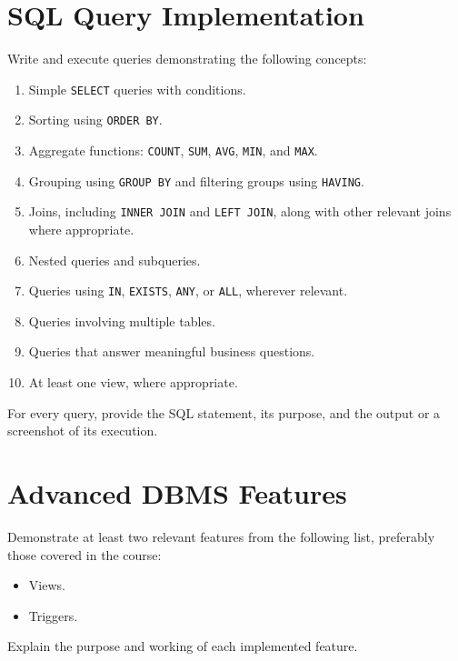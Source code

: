 \documentclass[12pt,a4paper]{report}
\begin{document}
\section{SQL Query Implementation}
Write and execute queries demonstrating the following concepts:
\begin{enumerate}
    \item Simple \texttt{SELECT} queries with conditions.
    \item Sorting using \texttt{ORDER BY}.
    \item Aggregate functions: \texttt{COUNT}, \texttt{SUM}, \texttt{AVG}, \texttt{MIN}, and \texttt{MAX}.
    \item Grouping using \texttt{GROUP BY} and filtering groups using \texttt{HAVING}.
    \item Joins, including \texttt{INNER JOIN} and \texttt{LEFT JOIN}, along with other relevant joins where appropriate.
    \item Nested queries and subqueries.
    \item Queries using \texttt{IN}, \texttt{EXISTS}, \texttt{ANY}, or \texttt{ALL}, wherever relevant.
    \item Queries involving multiple tables.
    \item Queries that answer meaningful business questions.
    \item At least one view, where appropriate.
\end{enumerate}

For every query, provide the SQL statement, its purpose, and the output or a screenshot of its execution.

\section{Advanced DBMS Features}
Demonstrate at least two relevant features from the following list, preferably those covered in the course:
\begin{itemize}
    \item Views.
    \item Triggers.
\end{itemize}

Explain the purpose and working of each implemented feature.
\end{document}
